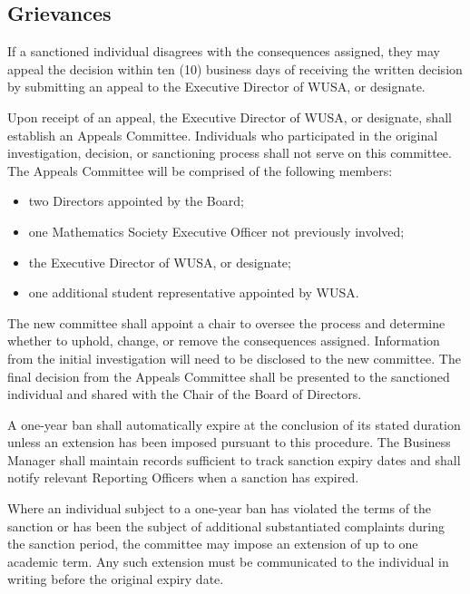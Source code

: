 \subsection{Grievances}
If a sanctioned individual disagrees with the consequences assigned, they may appeal the decision within ten (10) business days of receiving the written decision by submitting an appeal to the Executive Director of WUSA, or designate.

Upon receipt of an appeal, the Executive Director of WUSA, or designate, shall establish an Appeals Committee. Individuals who participated in the original investigation, decision, or sanctioning process shall not serve on this committee.  The Appeals Committee will be comprised of the following members:
\begin{itemize}
	\item two Directors appointed by the Board;
	\item one Mathematics Society Executive Officer not previously involved;
	\item the Executive Director of WUSA, or designate;
	\item one additional student representative appointed by WUSA.
\end{itemize}
The new committee shall appoint a chair to oversee the process and determine whether to uphold, change, or remove the consequences assigned. Information from the initial investigation will need to be disclosed to the new committee.  The final decision from the Appeals Committee shall be presented to the sanctioned individual and shared with the Chair of the Board of Directors.

A one-year ban shall automatically expire at the conclusion of its stated duration unless an extension has been imposed pursuant to this procedure. The Business Manager shall maintain records sufficient to track sanction expiry dates and shall notify relevant Reporting Officers when a sanction has expired.

Where an individual subject to a one-year ban has violated the terms of the sanction or has been the subject of additional substantiated complaints during the sanction period, the committee may impose an extension of up to one academic term.  Any such extension must be communicated to the individual in writing before the original expiry date.

